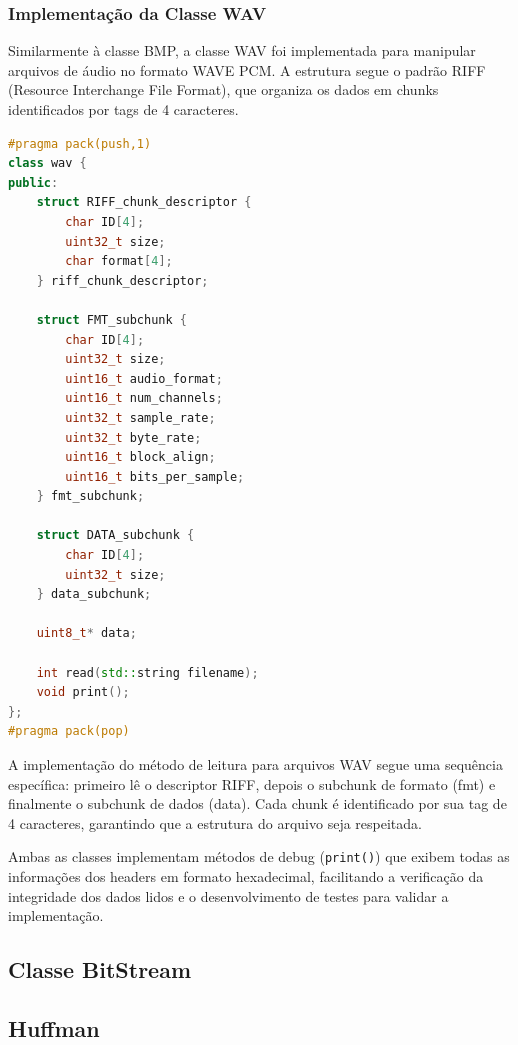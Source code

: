 \subsubsection{Implementação da Classe WAV}

Similarmente à classe BMP, a classe WAV foi implementada para manipular arquivos de áudio no formato WAVE PCM. A estrutura segue o padrão RIFF (Resource Interchange File Format), que organiza os dados em chunks identificados por tags de 4 caracteres.

\begin{lstlisting}[language=C++, caption=Estrutura da classe WAV]
#pragma pack(push,1)
class wav {
public:
    struct RIFF_chunk_descriptor {
        char ID[4];              
        uint32_t size;           
        char format[4];          
    } riff_chunk_descriptor;
    
    struct FMT_subchunk {
        char ID[4];              
        uint32_t size;           
        uint16_t audio_format;   
        uint16_t num_channels;   
        uint32_t sample_rate;    
        uint32_t byte_rate;      
        uint16_t block_align;    
        uint16_t bits_per_sample; 
    } fmt_subchunk;
    
    struct DATA_subchunk {
        char ID[4];              
        uint32_t size;           
    } data_subchunk;
    
    uint8_t* data;              

    int read(std::string filename);
    void print();
};
#pragma pack(pop)
\end{lstlisting}

A implementação do método de leitura para arquivos WAV segue uma sequência específica: primeiro lê o descriptor RIFF, depois o subchunk de formato (fmt) e finalmente o subchunk de dados (data). Cada chunk é identificado por sua tag de 4 caracteres, garantindo que a estrutura do arquivo seja respeitada.

Ambas as classes implementam métodos de debug (\texttt{print()}) que exibem todas as informações dos headers em formato hexadecimal, facilitando a verificação da integridade dos dados lidos e o desenvolvimento de testes para validar a implementação.

\subsection{Classe BitStream}

\subsection{Huffman}

